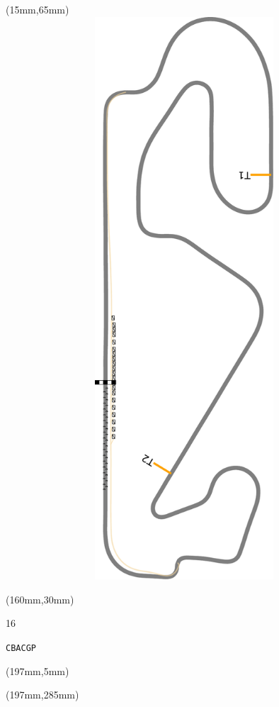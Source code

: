 \begin{textblock*}{185mm}(15mm,65mm)%
\centering
\mbox{\includegraphics[width=185mm,height=210mm,keepaspectratio]{PT/CBACGP.pdf}}
\end{textblock*}
\begin{textblock*}{40mm}(160mm,30mm)%
\Large
\par{} 
\par16 
\par\hfill\tiny\tt CBACGP\\
\end{textblock*}
\begin{textblock*}{20mm}(197mm,5mm)%
\fbox{\thepage}
\label{CBACGP}
\end{textblock*}
\begin{textblock*}{20mm}(197mm,285mm)%
\fbox{\thepage}
\end{textblock*}

